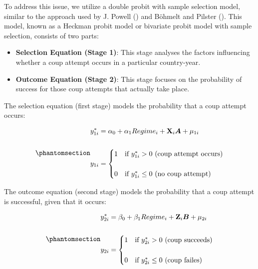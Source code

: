 \documentclass[
  12pt,
]{report}
\begin{document}
To address this issue, we utilize a double probit with sample selection
model, similar to the approach used by J. Powell
() and Böhmelt and Pilster
(). This model, known as a Heckman
probit model or bivariate probit model with sample selection, consists
of two parts:

\begin{itemize}
\item
  \textbf{Selection Equation (Stage 1)}: This stage analyses the factors
  influencing whether a coup attempt occurs in a particular
  country-year.
\item
  \textbf{Outcome Equation (Stage 2)}: This stage focuses on the
  probability of success for those coup attempts that actually take
  place.
\end{itemize}

The selection equation (first stage) models the probability that a coup
attempt occurs:

\begin{equation}\phantomsection\label{eq-eq4}{
\begin{aligned}
y_{1i}^*&=\alpha_0 + \alpha_1 Regime_i + \mathbf{X}_i \boldsymbol{A} + \mu_{1i}
\\
\\
y_{1i} &= 
\begin{cases} 
1 &\text{if $y_{1i}^*>0$ (coup attempt occurs)} \\
\\
0 &\text{if $y_{1i}^*\le0$ (no coup attempt)}
\end{cases}
\end{aligned}
}\end{equation}

The outcome equation (second stage) models the probability that a coup
attempt is successful, given that it occurs:

\begin{equation}\phantomsection\label{eq-eq5}{
\begin{aligned}
y_{2i}^*&=\beta_0 + \beta_1 Regime_i + \mathbf{Z}_i \boldsymbol{B} + \mu_{2i}
\\
\\
y_{2i} &= 
\begin{cases} 
1 &\text{if $y_{2i}^*>0$ (coup succeeds)} \\
\\
0 &\text{if $y_{2i}^*\le0$ (coup failes)}
\end{cases}
\end{aligned}
}\end{equation}
\end{document}
